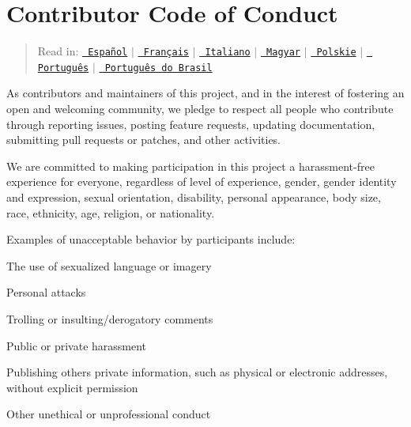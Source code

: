 \chapter{Contributor Code of Conduct}
\hypertarget{md_node__modules_2chai_2_c_o_d_e___o_f___c_o_n_d_u_c_t}{}\label{md_node__modules_2chai_2_c_o_d_e___o_f___c_o_n_d_u_c_t}
\label{md_node__modules_2chai_2_c_o_d_e___o_f___c_o_n_d_u_c_t_autotoc_md9846}%
%


\begin{quote}
Read in\+: \href{http://contributor-covenant.org/version/1/3/0/es/}{\texttt{ Español}} \texorpdfstring{$\vert$}{|} \href{http://contributor-covenant.org/version/1/3/0/fr/}{\texttt{ Français}} \texorpdfstring{$\vert$}{|} \href{http://contributor-covenant.org/version/1/3/0/it/}{\texttt{ Italiano}} \texorpdfstring{$\vert$}{|} \href{http://contributor-covenant.org/version/1/3/0/hu/}{\texttt{ Magyar}} \texorpdfstring{$\vert$}{|} \href{http://contributor-covenant.org/version/1/3/0/pl/}{\texttt{ Polskie}} \texorpdfstring{$\vert$}{|} \href{http://contributor-covenant.org/version/1/3/0/pt/}{\texttt{ Português}} \texorpdfstring{$\vert$}{|} \href{http://contributor-covenant.org/version/1/3/0/pt_br/}{\texttt{ Português do Brasil}} \end{quote}


As contributors and maintainers of this project, and in the interest of fostering an open and welcoming community, we pledge to respect all people who contribute through reporting issues, posting feature requests, updating documentation, submitting pull requests or patches, and other activities.

We are committed to making participation in this project a harassment-\/free experience for everyone, regardless of level of experience, gender, gender identity and expression, sexual orientation, disability, personal appearance, body size, race, ethnicity, age, religion, or nationality.

Examples of unacceptable behavior by participants include\+:


\begin{DoxyItemize}
\item The use of sexualized language or imagery
\item Personal attacks
\item Trolling or insulting/derogatory comments
\item Public or private harassment
\item Publishing other\textquotesingle{}s private information, such as physical or electronic addresses, without explicit permission
\item Other unethical or unprofessional conduct
\end{DoxyItemize}

